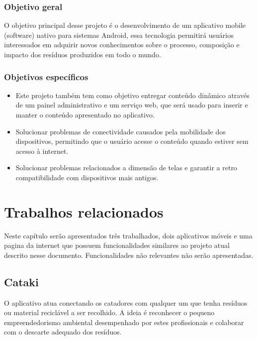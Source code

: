 \documentclass[
	12pt,				%
	openright,			%
	twoside,			%
	a4paper,			%
	english,			%
	french,				%
	spanish,			%
	brazil				%
	]{abntex2}
\begin{document}
\subsection{Objetivo geral}
O objetivo principal desse projeto é o desenvolvimento de um aplicativo mobile (software) nativo para sistemas Android, essa tecnologia permitirá usuários interessados em adquirir novos conhecimentos sobre o processo, composição e impacto dos resíduos produzidos em todo o mundo.

\subsection{Objetivos específicos}
\begin{itemize}
	\item Este projeto também tem como objetivo entregar conteúdo dinâmico através de um painel administrativo e um serviço web, que será usado para inserir e manter o conteúdo apresentado no aplicativo.
    \item Solucionar problemas de conectividade causados pela mobilidade dos dispositivos, permitindo que o usuário acesse o conteúdo quando estiver sem acesso à internet.
        \item Solucionar problemas relacionados a dimensão de telas e garantir a retro compatibilidade com dispositivos mais antigos.
\end{itemize}

\chapter{Trabalhos relacionados}

Neste capítulo serão apresentados três trabalhados, dois aplicativos móveis e uma pagina da internet que possuem funcionalidades similares ao projeto atual descrito nesse documento. Funcionalidades não relevantes não serão apresentadas.

\section{Cataki}
O aplicativo atua conectando os catadores com qualquer um que tenha resíduos ou material reciclável a ser recolhido. A ideia é reconhecer o pequeno empreendedorismo ambiental desempenhado por estes profissionais e colaborar com o descarte adequado dos resíduos.
\end{document}
